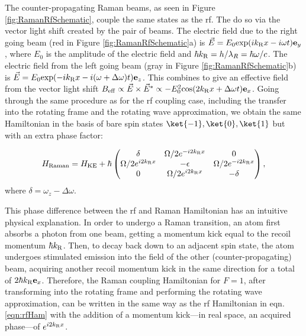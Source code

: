 	The counter-propagating Raman beams, as seen in Figure \ref{fig:RamanRfSchematic}, couple the same states as the rf. The do so via the vector light shift created by the pair of beams. The electric field due to the right going beam (red in Figure \ref{fig:RamanRfSchematic}a) is $\vec{E} = E_0 {\rm exp}(i k_{\rm R} x - i\omega t) \mathbf{e}_y$, where $E_0$ is the amplitude of the electric field and $\hbar k_{\rm R} = h/\lambda_R=\hbar\omega/c$. The electric field from the left going beam (gray in Figure \ref{fig:RamanRfSchematic}b) is $\vec{E} = E_0 {\rm exp}(-i k_{\rm R} x - i(\omega +\Delta \omega)t) \mathbf{e}_z$. This combines to give an effective field from the vector light shift\cite{SteckTextbook} $B_{\rm eff}\propto \vec{E}\times\vec{E}^* \propto -E^2_0 {\rm cos}(2k_{\rm R} x + \Delta\omega t)\mathbf{e}_x$. Going through the same procedure as for the rf coupling case, including the  transfer into the rotating frame and the rotating wave approximation, we obtain the same Hamiltonian in the basis of bare spin states $\ket{-1},\ket{0},\ket{1}$ but with an extra phase factor:
	 
\begin{equation}
H_{\rm Raman} = H_{\rm KE} + \hbar
 \begin{pmatrix} \delta & \Omega/2 e^{-i 2 k_{\rm R} x}  &  0  \\ 
\Omega/2 e^{i 2 k_{\rm R} x} & -\epsilon &  \Omega/2 e^{-i 2 k_{\rm R} x}\\
 0 & \Omega/2 e^{i 2 k_{\rm R} x} & -\delta  \\
 \end{pmatrix} \\,
\end{equation}
where $\delta = \omega_z - \Delta\omega$.

	This phase difference between the rf and Raman Hamiltonian has an intuitive physical explanation. In order to undergo a Raman transition, an atom first absorbs a photon from one beam, getting a momentum kick equal to the recoil momentum $\hbar k_{\rm R}$. Then, to decay back down to an adjacent spin state, the atom undergoes stimulated emission into the field of the other (counter-propagating) beam, acquiring another recoil momentum kick in the same direction for a total of $2\hbar k_{\rm R} \mathbf{e}_x$. Therefore, the Raman coupling Hamiltonian for $F=1$, after transforming into the rotating frame and performing the rotating wave approximation, can be written in the same way as the rf Hamiltonian in eqn. \ref{eqn:rfHam} with the addition of a momentum kick---in real space, an acquired phase---of $e^{i 2 k_{\rm R} x}$.

